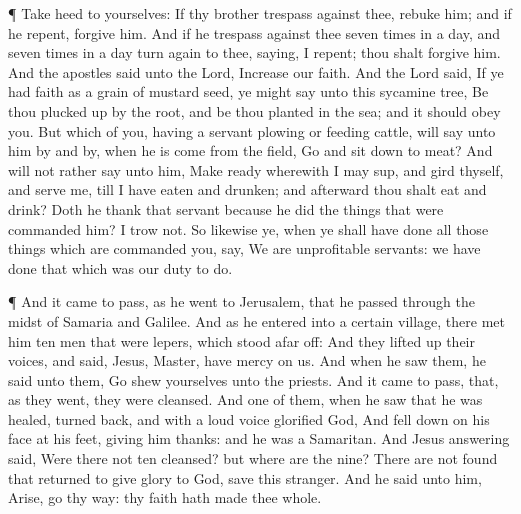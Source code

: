  ¶ Take heed to yourselves: If thy brother trespass against
thee, rebuke him; and if he repent, forgive him.  And if he
trespass against thee seven times in a day, and seven times in a day
turn again to thee, saying, I repent; thou shalt forgive him.
 And the apostles said unto the Lord, Increase our faith.
 And the Lord said, If ye had faith as a grain of mustard
seed, ye might say unto this sycamine tree, Be thou plucked up by the
root, and be thou planted in the sea; and it should obey you.
 But which of you, having a servant plowing or feeding
cattle, will say unto him by and by, when he is come from the field, Go
and sit down to meat?  And will not rather say unto him,
Make ready wherewith I may sup, and gird thyself, and serve me, till I
have eaten and drunken; and afterward thou shalt eat and drink?
 Doth he thank that servant because he did the things that
were commanded him? I trow not.  So likewise ye, when ye
shall have done all those things which are commanded you, say, We are
unprofitable servants: we have done that which was our duty to do.

 ¶ And it came to pass, as he went to Jerusalem, that he
passed through the midst of Samaria and Galilee.  And as he
entered into a certain village, there met him ten men that were lepers,
which stood afar off:  And they lifted up their voices, and
said, Jesus, Master, have mercy on us.  And when he saw
them, he said unto them, Go shew yourselves unto the priests. And it
came to pass, that, as they went, they were cleansed.  And
one of them, when he saw that he was healed, turned back, and with a
loud voice glorified God,  And fell down on his face at his
feet, giving him thanks: and he was a Samaritan.  And Jesus
answering said, Were there not ten cleansed? but where are the nine?
 There are not found that returned to give glory to God,
save this stranger.  And he said unto him, Arise, go thy
way: thy faith hath made thee whole.

